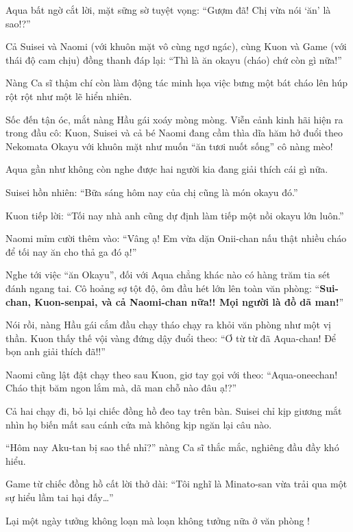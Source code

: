 \documentclass[../main.tex]{subfiles}
\begin{document}
Aqua bất ngờ cắt lời, mặt sững sờ tuyệt vọng: ``Gượm đã! Chị vừa nói `ăn' là sao!?''

Cả Suisei và Naomi (với khuôn mặt vô cùng ngơ ngác), cùng Kuon và Game (với thái độ cam chịu) đồng thanh đáp lại: ``Thì là ăn okayu (cháo) chứ còn gì nữa!''

Nàng Ca sĩ thậm chí còn làm động tác minh họa việc bưng một bát cháo lên húp rột rột như một lẽ hiển nhiên.

Sốc đến tận óc, mắt nàng Hầu gái xoáy mòng mòng. Viễn cảnh kinh hãi hiện ra trong đầu cô: Kuon, Suisei và cả bé Naomi đang cầm thìa dĩa hăm hở đuổi theo Nekomata Okayu với khuôn mặt như muốn ``ăn tươi nuốt sống'' cô nàng mèo!


Aqua gần như không còn nghe được hai người kia đang giải thích cái gì nữa.

Suisei hồn nhiên: ``Bữa sáng hôm nay của chị cũng là món okayu đó.''

Kuon tiếp lời: ``Tối nay nhà anh cũng dự định làm tiếp một nồi okayu lớn luôn.''

Naomi mỉm cười thêm vào: ``Vâng ạ! Em vừa dặn Onii-chan nấu thật nhiều cháo để tối nay ăn cho thả ga đó ạ!''

Nghe tới việc ``ăn Okayu'', đối với Aqua chẳng khác nào có hàng trăm tia sét đánh ngang tai. Cô hoảng sợ tột độ, ôm đầu hét lớn lên toàn văn phòng: ``\textbf{Sui-chan, Kuon-senpai, và cả Naomi-chan nữa!! Mọi người là đồ dã man!}''


Nói rồi, nàng Hầu gái cắm đầu chạy tháo chạy ra khỏi văn phòng như một vị thần. Kuon thấy thế vội vàng đứng dậy đuổi theo: ``Ơ từ từ đã Aqua-chan! Để bọn anh giải thích đã!!''

Naomi cũng lật đật chạy theo sau Kuon, giơ tay gọi với theo: ``Aqua-oneechan! Cháo thịt băm ngon lắm mà, dã man chỗ nào đâu ạ!?''

Cả hai chạy đi, bỏ lại chiếc đồng hồ đeo tay trên bàn. Suisei chỉ kịp giương mắt nhìn họ biến mất sau cánh cửa mà không kịp ngăn lại câu nào.

``Hôm nay Aku-tan bị sao thế nhỉ?'' nàng Ca sĩ thắc mắc, nghiêng đầu đầy khó hiểu.

Game từ chiếc đồng hồ cất lời thở dài: ``Tôi nghĩ là Minato-san vừa trải qua một sự hiểu lầm tai hại đấy\dots''

Lại một ngày tưởng không loạn mà loạn không tưởng nữa ở văn phòng \hll!

\omk
\end{document}
